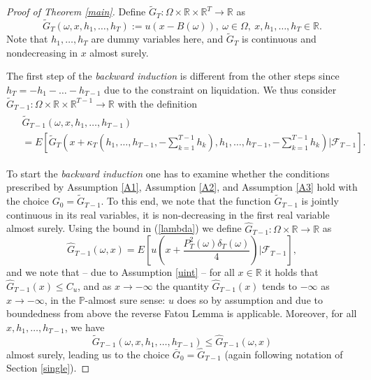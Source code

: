 \documentclass[a4paper]{article}
\begin{document}
\begin{proof}[Proof of Theorem \ref{main}]
Define $\tilde{G}_{T}:\Omega\times \mathbb{R}\times \mathbb{R}^{T}\to \mathbb{R}$ as
\begin{equation}\label{okt1}
\tilde{G}_{T}(\omega,x,h_{1},\ldots,h_{T}):=u(x-B(\omega)),\ \omega\in\Omega,\ x,h_{1},\ldots,h_{T}\in\mathbb{R}.
\end{equation}
Note that $h_{1},\ldots,h_{T}$ are dummy variables here, and $\tilde{G}_{T}$ is continuous and nondecreasing in $x$ almost surely. 

The first step of the \emph{backward induction} is different from the other steps
since $h_{T}=-h_{1}-\ldots-h_{T-1}$ due to the constraint on liquidation. 
We thus consider $\tilde{G}_{T-1} : \Omega \times \mathbb{R} \times \mathbb{R}^{T-1} \to \mathbb{R}$ with the definition
\begin{align}\label{okt2}
\begin{split}
& \tilde{G}_{T-1}(\omega,x,h_{1},\ldots,h_{T-1}) \\
&=
E\left[\tilde{G}_{T}\left(x+\kappa_{T}\left(h_{1},\ldots,h_{T-1},-\sum_{k=1}^{T-1}h_{k}\right), h_1, \ldots, h_{T-1},
-\sum_{k=1}^{T-1}h_{k}\right)\left\vert\mathcal{F}_{T-1}\right.\right].
\end{split}
\end{align}

To start the \emph{backward induction} one has to examine whether the conditions prescribed by Assumption \ref{A1}, 
Assumption \ref{A2}, and Assumption \ref{A3} hold with the choice $G_0 = \tilde{G}_{T-1}$. To this end, we note that 
the function $\tilde{G}_{T-1}$ is jointly continuous in its real variables, it is non-decreasing in the first 
real variable almost surely. Using the bound in (\ref{lambda}) we define $\hat G_{T-1}: \Omega \times \mathbb{R} \to \mathbb{R}$ as
$$\hat G_{T-1}(\omega,x) = E\left[u\left(x + \frac{P_T^2(\omega) \delta_T(\omega)}{4}\right)\vert\mathcal{F}_{T-1}\right],$$
and we note that -- due to Assumption \ref{uint} -- for all 
$x \in \mathbb{R}$ it holds that  $\hat G_{T-1}(x) \leq C_{u}$, and as $x \to -\infty$ the quantity $\hat G_{T-1}(x)$ tends to 
$- \infty$ as $x\to -\infty$, in the $\mathbb{P}$-almost sure sense: 
$u$ does so by assumption and due to boundedness from above the reverse Fatou Lemma is applicable. 
Moreover, for all $x, h_1, \ldots, h_{T-1}$, we have $$\tilde{G}_{T-1}(\omega,x,h_{1},\ldots,h_{T-1}) \leq \hat{G}_{T-1}(\omega,x)$$ 
almost surely, leading us to the choice $\bar G_{0} = \hat G_{T-1}$ (again following notation of Section \ref{single}). 


\end{proof}
\end{document}
